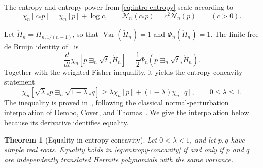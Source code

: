 \documentclass[12pt,reqno]{amsart}
\newtheorem{theorem}{Theorem}[section]
\theoremstyle{definition}
\theoremstyle{remark}
\newcommand{\Var}{\operatorname{Var}}
\newcommand{\cN}{\mathcal N}
\begin{document}
The entropy and entropy power from \eqref{eq:intro-entropy} scale according to
\begin{equation}\label{eq:entropy-scaling}
 \chi_n[c_*p]=\chi_n[p]+\log c,
 \qquad \cN_n(c_*p)=c^2\cN_n(p)
 \qquad(c>0).
\end{equation}

Let \(\check H_n=H_{n,1/(n-1)}\), so that
\(\Var(\check H_n)=1\) and \(\Phi_n(\check H_n)=1\).  The finite free de
Bruijn identity of~\cite{GVS26} is
\begin{equation}\label{eq:debruijn}
 \frac{d}{dt}\chi_n[p\boxplus_n\sqrt t_*\check H_n]
 =\frac12\Phi_n(p\boxplus_n\sqrt t_*\check H_n).
\end{equation}
Together with the weighted Fisher inequality, it yields the entropy
concavity statement
\begin{equation}\label{eq:entropy-concavity}
 \chi_n[\sqrt\lambda_*p\boxplus_n\sqrt{1-\lambda}_*q]
 \geq\lambda\chi_n[p]+(1-\lambda)\chi_n[q],
 \qquad 0\leq\lambda\leq1.
\end{equation}
The inequality is proved in~\cite{GVS26}, following the classical
normal-perturbation interpolation of Dembo, Cover, and
Thomas~\cite{DCT91}.  We give the interpolation below because its
derivative identifies equality.

\begin{theorem}[Equality in entropy concavity]
\label{thm:entropy-concavity-equality}
Let \(0<\lambda<1\), and let \(p,q\) have simple real roots.  Equality
holds in \eqref{eq:entropy-concavity} if and only if \(p\) and \(q\) are
independently translated Hermite polynomials with the same variance.
\end{theorem}
\end{document}
